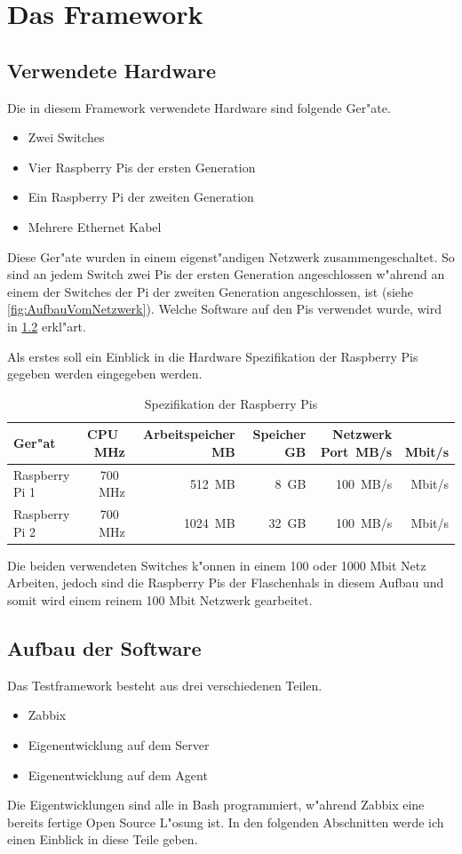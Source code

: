 \chapter{Das Framework}
\label{cha:framework}


\section{Verwendete Hardware} \label{sec:verwendeteHardware}
Die in diesem Framework verwendete Hardware sind folgende Ger"ate. %
\begin{itemize}
\item Zwei Switches
\item Vier Raspberry Pis der ersten Generation
\item Ein Raspberry Pi der zweiten Generation
\item Mehrere Ethernet Kabel
\end{itemize}
Diese Ger"ate wurden in einem eigenst"andigen Netzwerk zusammengeschaltet. So sind an jedem Switch zwei Pis %
der ersten Generation angeschlossen w"ahrend an einem der Switches der Pi der zweiten Generation angeschlossen, %
ist (siehe \cref{fig:AufbauVomNetzwerk}). Welche Software auf den Pis verwendet wurde, wird in \cref{sec:aufbauSoftware} erkl"art. 

Als erstes soll  ein Einblick in die Hardware Spezifikation der Raspberry Pis gegeben werden eingegeben werden. 
\begin{table}
\centering
\begin{tabular}{l%
 r<{\,MHz}%
 r<{\,MB}%
 r<{\,GB}%
 r<{\,MB/s}%
 r<{\,Mbit/s}%
}
Ger"at 		& CPU	& Arbeitspeicher	& Speicher	& Netzwerk Port	\\
\hline
Raspberry Pi 1	& 700	& 512			& 8		& 100		\\
Raspberry Pi 2 	& 700 	& 1024			& 32		& 100		\\

\end{tabular}
\caption{Spezifikation der Raspberry Pis}
\label{tab:hardwarespezifiktion}
\end{table}

Die beiden verwendeten Switches k"onnen in einem 100 oder 1000 Mbit Netz Arbeiten, jedoch sind die Raspberry Pis der Flaschenhals in diesem %
Aufbau und somit wird einem reinem 100 Mbit Netzwerk gearbeitet. 

\section{Aufbau der Software} \label{sec:aufbauSoftware}
Das Testframework besteht aus drei verschiedenen Teilen. %
\begin{itemize}
\item Zabbix %
\item Eigenentwicklung auf dem Server %
\item Eigenentwicklung auf dem Agent %
\end{itemize}
Die Eigentwicklungen sind alle in Bash programmiert, w"ahrend Zabbix eine bereits fertige Open Source L"osung %
ist. In den folgenden Abschnitten werde ich einen Einblick in diese Teile geben. %

